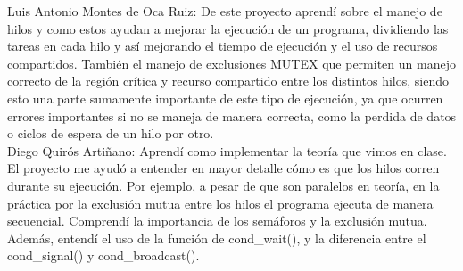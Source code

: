 \documentclass[12pt, article, natbib]{IEEEtran}
\begin{document}
Luis Antonio Montes de Oca Ruiz: De este proyecto aprendí sobre el manejo de hilos y como estos ayudan a mejorar la ejecución de un programa, dividiendo las tareas en cada hilo y así mejorando el tiempo de ejecución y el uso de recursos compartidos. También el manejo de exclusiones MUTEX que permiten un manejo correcto de la región crítica y recurso compartido entre los distintos hilos, siendo esto una parte sumamente importante de este tipo de ejecución, ya que ocurren errores importantes si no se maneja de manera correcta, como la perdida de datos o ciclos de espera de un hilo por otro.\\

Diego Quirós Artiñano: Aprendí como implementar la teoría que vimos en clase. El proyecto me ayudó a entender en mayor detalle cómo es que los hilos corren durante su ejecución. Por ejemplo, a pesar de que son paralelos en teoría, en la práctica por la exclusión mutua entre los hilos el programa ejecuta de manera secuencial. Comprendí la importancia de los semáforos y la exclusión mutua. Además, entendí el uso de la función de cond\_wait(), y la diferencia entre el cond\_signal() y cond\_broadcast().\\

\newpage
\onecolumn
 

\end{document}
